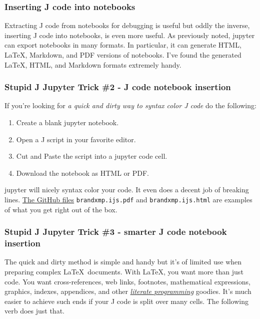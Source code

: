 \subsubsection*{Inserting J code into
notebooks}%

Extracting J code from notebooks for debugging is useful but oddly the
inverse, inserting J code into notebooks, is even more useful. As
previously noted, jupyter can export notebooks in many formats. In
particular, it can generate HTML, \LaTeX, Markdown, and PDF versions of
notebooks. I've found the generated \LaTeX, HTML, and Markdown formats
extremely handy.

\subsubsection*{Stupid J Jupyter Trick \#2 - J code notebook
insertion}%

If you're looking for \emph{a quick and dirty way to syntax color J
code} do the following:

\begin{enumerate}
\def\labelenumi{\arabic{enumi}.}
\tightlist
\item
  Create a blank jupyter notebook.
\item
  Open a J script in your favorite editor.
\item
  Cut and Paste the script into a jupyter code cell.
\item
  Download the notebook as HTML or PDF.
\end{enumerate}

jupyter will nicely syntax color your code. It even does a decent job of
breaking lines. \href{https://github.com/bakerjd99/jacks/tree/master/brandxmp/jupyter}{The GitHub files}
\texttt{brandxmp.ijs.pdf} and \texttt{brandxmp.ijs.html} are examples of what you get right out of the box.

\subsubsection*{Stupid J Jupyter Trick \#3 - smarter J code notebook
insertion}%

The quick and dirty method is simple and handy but it's of limited use
when preparing complex \LaTeX\ documents. With \LaTeX, you want more than
just code. You want cross-references, web links, footnotes, mathematical
expressions, graphics, indexes, appendices, and other
\href{https://www-cs-faculty.stanford.edu/~knuth/lp.html}{\emph{literate
programming}} goodies. It's much easier to achieve such ends if your J
code is split over many cells. The following verb does just that.


